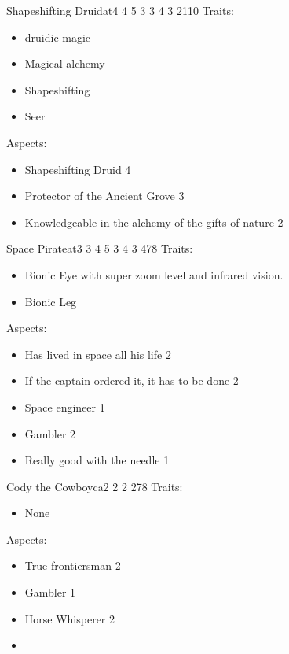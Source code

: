 \documentclass[11pt]{article}
\begin{document}
{\begin{npc}{Shapeshifting Druid}{at}{4 4 5 3 3 4 3 2}{110}
Traits:
\begin{itemize}
\item druidic magic
\item Magical alchemy
\item Shapeshifting
\item Seer
\end{itemize}

\columnbreak

Aspects:
\begin{itemize}
\item Shapeshifting Druid 4
\item Protector of the Ancient Grove 3
\item Knowledgeable in the alchemy of the gifts of nature 2
\end{itemize}
\end{npc}

\begin{npc}{Space Pirate}{at}{3 3 4 5 3 4 3 4}{78}
Traits:
\begin{itemize}
\item Bionic Eye with super zoom level and infrared vision.
\item Bionic Leg
\end{itemize}

\columnbreak

Aspects:
\begin{itemize}
\item Has lived in space all his life 2
\item If the captain ordered it, it has to be done 2
\item Space engineer 1
\item Gambler 2
\item Really good with the needle 1
\end{itemize}
\end{npc}


\begin{npc}{Cody the Cowboy}{ca}{2 2 2 2}{78}
Traits:
\begin{itemize}
\item None
\end{itemize}

\columnbreak

Aspects:
\begin{itemize}
\item True frontiersman 2
\item Gambler 1
\item Horse Whisperer 2
\item 


\end{itemize}
\end{npc}}
\end{document}

